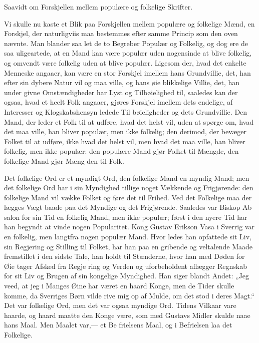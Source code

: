 \documentclass[12pt]{book}
\newcommand{\opage}[1]{\marginnote{\footnotesize\textit{[#1]}}}
\begin{document}
Saavidt om Forskjellen mellem populære og folkelige
Skrifter.

Vi skulle nu kaste et Blik paa Forskjellen mellem
populære og folkelige Mænd, en Forskjel, der naturligviis
maa bestemmes efter samme Princip som den oven\-%
nævnte. Man blander saa let de to Begreber Populær
og Folkelig, og dog ere de saa uligeartede, at en Mand
kan være populær uden nogensinde at blive folkelig, og
omvendt være folkelig uden at blive populær. Ligesom
der, hvad det enkelte Menneske angaaer, kan være en
stor Forskjel imellem hans Grundvillie, det, han
efter sin dybere Natur vil og maa ville, og hans øie\-%
blikkelige Villie, det, han under givne Omstændigheder
har Lyst og Tilbøielighed til, saaledes kan der ogsaa,
hvad et heelt Folk angaaer, gjøres Forskjel imellem dets
endelige, af Interesser og Klogskabshensyn ledede Til\-%
bøieligheder og dets Grundvillie. Den Mand, der leder
et Folk til at udføre, hvad det helst vil, uden at spørge
om, hvad det maa ville, han bliver populær, men ikke
folkelig; den derimod, der bevæger Folket til at udføre,
ikke hvad det helst vil, men hvad det maa ville, han
bliver folkelig, men ikke populær: den populære Mand
\opage{129}\setcounter{footnote}{0}%
gjør Folket til Mængde, den folkelige Mand gjør Mæng\-%
den til Folk.

Det folkelige Ord er et myndigt Ord, den folkelige
Mand en myndig Mand; men det folkelige Ord har i sin
Myndighed tillige noget Vækkende og Frigjørende: den
folkelige Mand vil vække Folket og føre det til Frihed.
Ved det Folkelige maa der lægges Vægt baade paa det
Myndige og det Frigjørende. Saaledes var Biskop Ab\-%
salon for sin Tid en folkelig Mand, men ikke populær;
først i den nyere Tid har han begyndt at vinde nogen
Popularitet. Kong Gustav Erikson Vasa i Sverrig var
en folkelig, men langtfra nogen populær Mand. Hvor\-%
ledes han opfattede sit Liv, sin Regjering og Stilling til
Folket, har han paa en gribende og veltalende Maade
fremstillet i den sidste Tale, han holdt til Stænderne,
hvor han med Døden for Øie tager Afsked fra Regje\-%
ring og Verden og uforbeholdent aflægger Regnskab
for sit Liv og Brugen af sin kongelige Myndighed. Han
siger blandt Andet: „Jeg veed, at jeg i Manges Øine
har været en haard Konge, men de Tider skulle komme,
da Sverriges Børn vilde rive mig op af Mulde, om
det stod i deres Magt.“ Det var folkelige Ord, men det
var ogsaa myndige Ord. Tidens Vilkaar vare haarde,
og haard maatte den Konge være, som med Gustavs
Midler skulde naae hans Maal. Men Maalet var,--- et Be\-%
frielsens Maal, og i Befrielsen laa det Folkelige.
\end{document}
